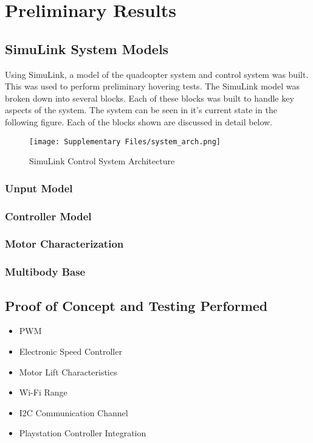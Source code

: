 \section{Preliminary Results}
\subsection{SimuLink System Models}
Using SimuLink, a model of the quadcopter system and control system was built.  This was used to perform preliminary hovering tests.  The SimuLink model was broken down into several blocks.  Each of these blocks was built to handle key aspects of the system.  The system can be seen in it's current state in the following figure.  Each of the blocks shown are discussed in detail below.

\begin{figure}
  \centering
  \texttt{[image: Supplementary Files/system\_arch.png]}
  \caption{SimuLink Control System Architecture}
  \label{fig:sys_arch}
\end{figure}

  
\subsubsection{Unput Model}

\subsubsection{Controller Model}

\subsubsection{Motor Characterization}

\subsubsection{Multibody Base}


  \subsection{Proof of Concept and Testing Performed}
\begin{itemize}
  \item{PWM}
  \item{Electronic Speed Controller}
  \item{Motor Lift Characteristics}
  \item{Wi-Fi Range}
  \item{I2C Communication Channel}
  \item{Playstation Controller Integration}
 \end{itemize}
  
